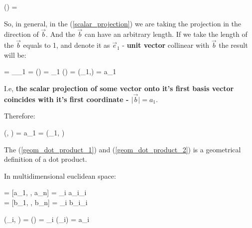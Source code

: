 \documentclass{article}
\begin{document}
\beq \label{cosine_dot_product}
\cos() = 
\eeq









So, in general, in the (\ref{scalar_projection}) we are taking the projection in the direction of $\vec{b}$. And the $\vec{b}$ can have an arbitrary length.
If we take the length of the $\vec{b}$ equals to 1, and denote it as  $\vec{e}_1$ - \textbf{unit vector} collinear with $\vec{b}$ the result will be:

\beq \label{scalar_projection_onto_e1}
\vert {} \vert = _{_{1}} = \vert {} \vert \cos()
= \vert {} \vert \vert {}_{1} \vert \cos()
= (_{1},) = a_{1}
\eeq 



I.e, \textbf{the scalar projection of some vector onto it's first basis vector coincides with it's first coordinate - $\vert \vec{b} \vert = a_{1}$}.

Therefore:

\beq \label{geom_dot_product_2}
(, ) = a_1 \vert {} \vert = (_{1}, ) \vert {} \vert
\eeq

The (\ref{geom_dot_product_1}) and (\ref{geom_dot_product_2}) is a geometrical definition of a dot product.


In multidimensional euclidean space:

\beq \label{vector_in_basis}
 = [a_{1}, \cdots , a_{n}] = \sum_{i} a_{i}_{i} \\
 = [b_{1}, \cdots , b_{n}] = \sum_{i} b_{i}_{i} \\
\eeq

\beq \label{multi_scalar_projection_onto_e1}
(_{i}, ) = \vert {} \vert \cos () = \vert  {}_{i} \vert \vert {} \vert \cos (\varphi_{i}) =  a_{i}
\eeq
\end{document}
